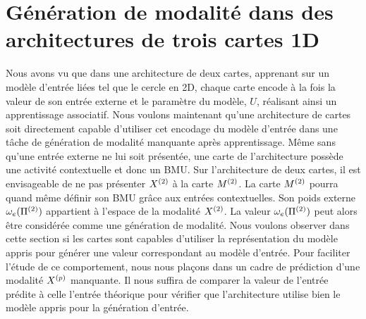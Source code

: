 \documentclass[../main]{subfiles}
\begin{document}
\section{Génération de modalité dans des architectures de trois cartes 1D}


Nous avons vu que dans une architecture de deux cartes, apprenant sur un modèle d'entrée liées tel que le cercle en 2D, chaque carte encode à la fois la valeur de son entrée externe et le paramètre du modèle, $U$, réalisant ainsi un apprentissage associatif. 
Nous voulons maintenant qu'une architecture de cartes soit directement capable d'utiliser cet encodage du modèle d'entrée dans une tâche de génération de modalité manquante après apprentissage.
Même sans qu'une entrée externe ne lui soit présentée, une carte de l'architecture possède une activité contextuelle et donc un BMU. 
Sur l'architecture de deux cartes, il est envisageable de ne pas présenter $X^{({2})}$ à la carte $M^{({2})}$. La carte $M^{({2})}$ pourra quand même définir son BMU grâce aux entrées contextuelles. Son poids externe $\omega_e(\Pi^{({2})})$ appartient à l'espace de la modalité $X^{({2})}$. 
La valeur $\omega_e(\Pi^{({2})})$ peut alors être considérée comme une génération de modalité. 
Nous voulons observer dans cette section si les cartes sont capables d'utiliser la représentation du modèle appris pour générer une valeur correspondant au modèle d'entrée.
Pour faciliter l'étude de ce comportement, nous nous plaçons dans un cadre de prédiction d'une modalité $X^{({p})}$ manquante. Il nous suffira de comparer la valeur de l'entrée prédite à celle l'entrée théorique pour vérifier que l'architecture utilise bien le modèle appris pour la génération d'entrée.
\end{document}
